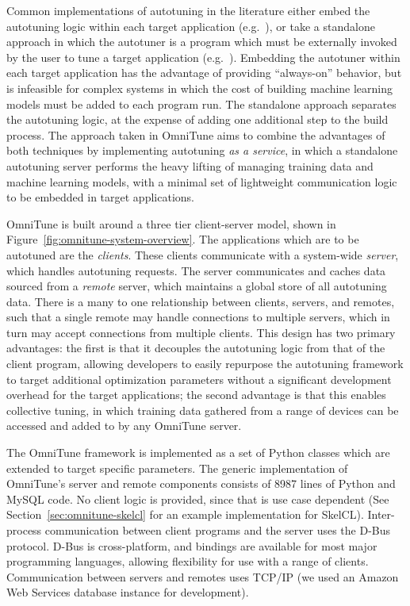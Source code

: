 \documentclass[nonatbib,preprint,nocopyrightspace,9pt]{sigplanconf}
\begin{document}
Common implementations of autotuning in the literature either embed
the autotuning logic within each target application
(e.g.~\cite{Chen2014}), or take a standalone approach in which the
autotuner is a program which must be externally invoked by the user to
tune a target application (e.g.~\cite{Lutz2013}). Embedding the
autotuner within each target application has the advantage of
providing ``always-on'' behavior, but is infeasible for complex
systems in which the cost of building machine learning models must be
added to each program run. The standalone approach separates the
autotuning logic, at the expense of adding one additional step to the
build process. The approach taken in OmniTune aims to combine the
advantages of both techniques by implementing autotuning \emph{as a
  service}, in which a standalone autotuning server performs the heavy
lifting of managing training data and machine learning models, with a
minimal set of lightweight communication logic to be embedded in
target applications.

OmniTune is built around a three tier client-server model, shown in
Figure~\ref{fig:omnitune-system-overview}. The applications which are
to be autotuned are the \emph{clients}. These clients communicate with
a system-wide \emph{server}, which handles autotuning requests. The
server communicates and caches data sourced from a \emph{remote}
server, which maintains a global store of all autotuning data. There
is a many to one relationship between clients, servers, and remotes,
such that a single remote may handle connections to multiple servers,
which in turn may accept connections from multiple clients. This
design has two primary advantages: the first is that it decouples the
autotuning logic from that of the client program, allowing developers
to easily repurpose the autotuning framework to target additional
optimization parameters without a significant development overhead for
the target applications; the second advantage is that this enables
collective tuning, in which training data gathered from a range of
devices can be accessed and added to by any OmniTune server.

The OmniTune framework is implemented as a set of Python classes which
are extended to target specific parameters. The generic implementation
of OmniTune's server and remote components consists of 8987 lines of
Python and MySQL code. No client logic is provided, since that is use
case dependent (See Section~\ref{sec:omnitune-skelcl} for an example
implementation for SkelCL). Inter-process communication between client
programs and the server uses the D-Bus protocol. D-Bus is
cross-platform, and bindings are available for most major programming
languages, allowing flexibility for use with a range of
clients. Communication between servers and remotes uses TCP/IP (we
used an Amazon Web Services database instance for development).
\end{document}
